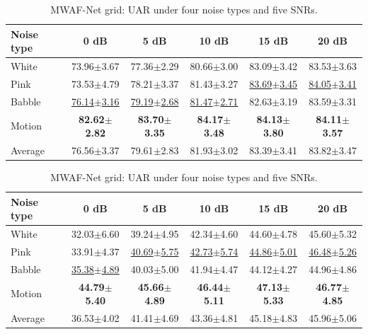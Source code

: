 \begin{table}[H]
\centering\color{black}
\caption{MWAF-Net grid: UAR under four noise types and five SNRs.}\label{tab:supp_noise_grid}
\begingroup
\fontsize{9}{10.5}\selectfont
\setlength{\tabcolsep}{7pt}\renewcommand{\arraystretch}{1.13}
\begin{tabular*}{\linewidth}{@{\extracolsep{\fill}}lccccc@{}}\toprule
\textbf{Noise type} & \textbf{0 dB} & \textbf{5 dB} & \textbf{10 dB} & \textbf{15 dB} & \textbf{20 dB}\\\midrule
White & 73.96$\pm$3.67 & 77.36$\pm$2.29 & 80.66$\pm$3.00 & 83.09$\pm$3.42 & 83.53$\pm$3.63\\
Pink & 73.53$\pm$4.79 & 78.21$\pm$3.37 & 81.43$\pm$3.27 & \underline{83.69$\pm$3.45} & \underline{84.05$\pm$3.41}\\
Babble & \underline{76.14$\pm$3.16} & \underline{79.19$\pm$2.68} & \underline{81.47$\pm$2.71} & 82.63$\pm$3.19 & 83.59$\pm$3.31\\
Motion & \textbf{82.62$\pm$2.82} & \textbf{83.70$\pm$3.35} & \textbf{84.17$\pm$3.48} & \textbf{84.13$\pm$3.80} & \textbf{84.11$\pm$3.57}\\
Average & 76.56$\pm$3.37 & 79.61$\pm$2.83 & 81.93$\pm$3.02 & 83.39$\pm$3.41 & 83.82$\pm$3.47\\
\bottomrule\end{tabular*}
\endgroup
{}
\begingroup
\fontsize{9}{10.5}\selectfont
\setlength{\tabcolsep}{7pt}\renewcommand{\arraystretch}{1.13}
\begin{tabular*}{\linewidth}{@{\extracolsep{\fill}}lccccc@{}}\toprule
\textbf{Noise type} & \textbf{0 dB} & \textbf{5 dB} & \textbf{10 dB} & \textbf{15 dB} & \textbf{20 dB}\\\midrule
White & 32.03$\pm$6.60 & 39.24$\pm$4.95 & 42.34$\pm$4.60 & 44.60$\pm$4.78 & 45.60$\pm$5.32\\
Pink & 33.91$\pm$4.37 & \underline{40.69$\pm$5.75} & \underline{42.73$\pm$5.74} & \underline{44.86$\pm$5.01} & \underline{46.48$\pm$5.26}\\
Babble & \underline{35.38$\pm$4.89} & 40.03$\pm$5.00 & 41.94$\pm$4.47 & 44.12$\pm$4.27 & 44.96$\pm$4.86\\
Motion & \textbf{44.79$\pm$5.40} & \textbf{45.66$\pm$4.89} & \textbf{46.44$\pm$5.11} & \textbf{47.13$\pm$5.33} & \textbf{46.77$\pm$4.85}\\
Average & 36.53$\pm$4.02 & 41.41$\pm$4.69 & 43.36$\pm$4.81 & 45.18$\pm$4.83 & 45.96$\pm$5.06\\
\bottomrule\end{tabular*}
\endgroup

\end{table}

